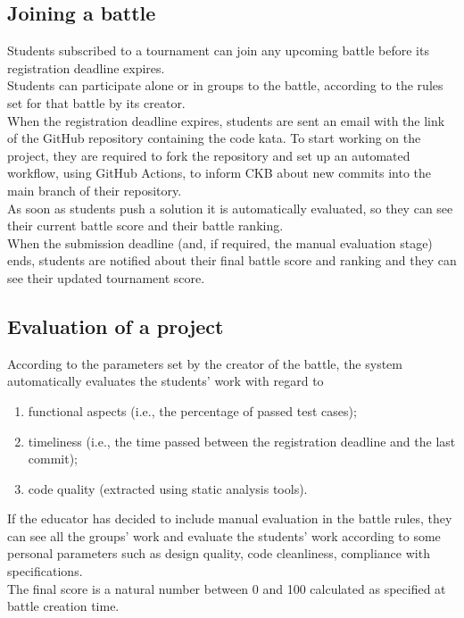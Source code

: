 \subsection{Joining a battle}
Students subscribed to a tournament can join any upcoming battle before its registration deadline expires.\\
Students can participate alone or in groups to the battle, according to the rules set for that battle by its creator.\\
When the registration deadline expires, students are sent an email with the link of the GitHub repository containing the 
code kata. To start working on the project, they are required to fork the repository and set up an automated workflow, 
using GitHub Actions, to inform CKB about new commits into the main branch of their repository.\\
As soon as students push a solution it is automatically evaluated, so they can see their current battle score and their 
battle ranking.\\
When the submission deadline (and, if required, the manual evaluation stage) ends, students are notified about their final 
battle score and ranking and they can see their updated tournament score.\\

\subsection{Evaluation of a project}
According to the parameters set by the creator of the battle, the system automatically evaluates the students' work with regard to
\begin{enumerate}
  \item functional aspects (i.e., the percentage of passed test cases);
  \item timeliness (i.e., the time passed between the registration deadline and the last commit);
  \item code quality (extracted using static analysis tools).
\end{enumerate}
If the educator has decided to include manual evaluation in the battle rules, they can see all the groups' work and evaluate 
the students' work according to some personal parameters such as design quality, code cleanliness, compliance with specifications.\\
The final score is a natural number between 0 and 100 calculated as specified at battle creation time.\\


